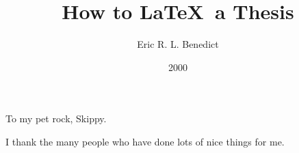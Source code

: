 

\clearpage{}  %



\title{How to \LaTeX\ a Thesis}
\author{Eric R. L. Benedict}
\date{2000}
\prelim
\maketitle

\copyrightpage

\begin{dedication}
To my pet rock, Skippy.
\end{dedication}

\begin{acknowledgments}
I thank the many people who have done lots of nice things for me.
\end{acknowledgments}

\tableofcontents
\listoftables
\listoffigures

